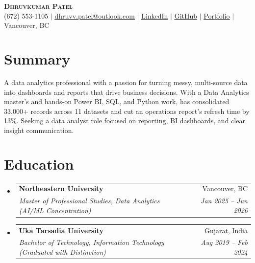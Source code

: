 \documentclass[letterpaper,11pt]{article}
\makeatletter
\newcommand{\resumeSubheading}[4]{
  \vspace{-2pt}\item
    \begin{tabular*}{0.97\textwidth}[t]{l@{\extracolsep{\fill}}r}
      \textbf{#1} & #2 \\
      \textit{\small#3} & \textit{\small #4} \\
    \end{tabular*}\vspace{-7pt}
}
\newcommand{\resumeSubHeadingListStart}{\begin{itemize}[leftmargin=0.15in, label={}]}
\newcommand{\resumeSubHeadingListEnd}{\end{itemize}}
\makeatother
\begin{document}
\begin{center}
    \textbf{\Huge \scshape Dhruvkumar Patel} \\ \vspace{1pt}
    \small (672) 553-1105 $|$ \href{mailto:dhruvv.patel@outlook.com}{\underline{dhruvv.patel@outlook.com}} $|$
    \href{https://www.linkedin.com/in/dhruvkumarpatell/}{\underline{LinkedIn}} $|$
    \href{https://github.com/pateldhruvkumar}{\underline{GitHub}} $|$
    \href{https://dhruvvkumarpatel.vercel.app/}{\underline{Portfolio}} $|$
    Vancouver, BC
\end{center}

\section{Summary}
  \small{A data analytics professional with a passion for turning messy, multi-source data into dashboards and reports that drive business decisions. With a Data Analytics master's and hands-on Power BI, SQL, and Python work, has consolidated 33,000+ records across 11 datasets and cut an operations report's refresh time by 13\%. Seeking a data analyst role focused on reporting, BI dashboards, and clear insight communication.}
  \vspace{-4pt}

\section{Education}
  \resumeSubHeadingListStart
    \resumeSubheading
      {Northeastern University}{Vancouver, BC}
      {Master of Professional Studies, Data Analytics (AI/ML Concentration)}{Jan 2025 -- Jun 2026}
    \resumeSubheading
      {Uka Tarsadia University}{Gujarat, India}
      {Bachelor of Technology, Information Technology (Graduated with Distinction)}{Aug 2019 -- Feb 2024}
  \resumeSubHeadingListEnd

\end{document}

